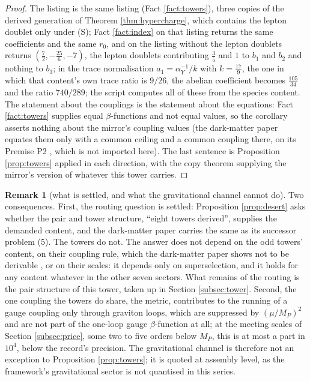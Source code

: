 \documentclass[11pt]{article}
\theoremstyle{definition}
\newtheorem{remark}[theorem]{Remark}
\begin{document}
\begin{proof}
The listing is the same listing (Fact \ref{fact:towers}), three copies of the derived generation of Theorem \ref{thm:hypercharge}, which contains the lepton doublet only under (S); Fact \ref{fact:index} on that listing returns the same coefficients and the same $r_{0}$, and on the listing without the lepton doublets returns $(\tfrac72, -\tfrac{25}{6}, -7)$, the lepton doublets contributing $\tfrac35$ and $1$ to $b_{1}$ and $b_{2}$ and nothing to $b_{3}$; in the trace normalisation $a_{1} = \alpha_{Y}^{-1}/k$ with $k = \tfrac{17}{9}$, the one in which that content's own trace ratio is $9/26$, the abelian coefficient becomes $\tfrac{105}{34}$ and the ratio $740/289$; the script computes all of these from the species content. The statement about the couplings is the statement about the equations: Fact \ref{fact:towers} supplies equal $\beta$-functions and not equal values, so the corollary asserts nothing about the mirror's coupling values (the dark-matter paper equates them only with a common ceiling and a common coupling there, on its Premise P2 \cite[Thm.~4.3(iii),(iv)]{ButlerT14}, which is not imported here). The last sentence is Proposition \ref{prop:towers} applied in each direction, with the copy theorem supplying the mirror's version of whatever this tower carries.
\end{proof}

\begin{remark}[what is settled, and what the gravitational channel cannot do]\label{rem:closes}
Two consequences. First, the routing question is settled: Proposition \ref{prop:desert} asks whether the pair and tower structure, ``eight towers derived'', supplies the demanded content, and the dark-matter paper carries the same as its successor problem (5). The towers do not. The answer does not depend on the odd towers' content, on their coupling rule, which the dark-matter paper shows not to be derivable \cite[Prop.~A.4]{ButlerT14}, or on their scales: it depends only on superselection, and it holds for any content whatever in the other seven sectors. What remains of the routing is the pair structure of this tower, taken up in Section \ref{subsec:tower}. Second, the one coupling the towers do share, the metric, contributes to the running of a gauge coupling only through graviton loops, which are suppressed by $(\mu/M_{P})^{2}$ and are not part of the one-loop gauge $\beta$-function at all; at the meeting scales of Section \ref{subsec:price}, some two to five orders below $M_{P}$, this is at most a part in $10^{4}$, below the record's precision. The gravitational channel is therefore not an exception to Proposition \ref{prop:towers}; it is quoted at assembly level, as the framework's gravitational sector is not quantised in this series.
\end{remark}
\end{document}
